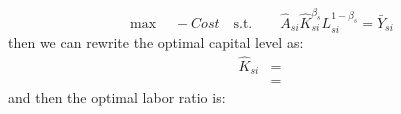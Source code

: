 \begin{equation*}
    \max  \quad
     - 		Cost \quad \text{s.t.} \quad \quad \hat{A}_{si}\hat{K}_{si}^{\beta_s} L_{si}^{1-\beta_s} = \bar{Y}_{si}
\end{equation*}
\begin{equation*}

\end{equation*}
then we can rewrite the optimal capital level as:
\begin{equation*}
    \begin{split}
        \hat{K}_{si} &= \\
        & = 
    \end{split}
\end{equation*}
and then the optimal labor ratio is:
\begin{equation*}
    
\end{equation*}